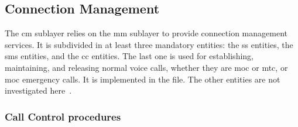 \subsection{Connection Management}

  The \gls{cm} sublayer relies on the \gls{mm} sublayer to provide
  connection management services. It is subdivided in at least three
  mandatory entities: the \gls{ss} entities, the \gls{sms} entities,
  and the \gls{cc} entities. The last one is used for establishing,
  maintaining, and releasing normal voice calls, whether they are
  \gls{moc} or \gls{mtc}, or \gls{moc} emergency calls. It is
  implemented in the  file. The other
  entities are not investigated here~\cite{3gpp_ts_2015-5}.
  \iffalse
  \subsubsection{Short Message Services}

  The \gls{sms} entity on the \gls{ms} implements two protocols to
  communicate over the Um interface: the \gls{smcp}, and the
  \gls{smrp}. The first one is used to communicate between two
  \gls{smc} entities, while the second one is used to communicate
  between two \gls{smr} entities. An \gls{smc} entity is part of the
  \gls{cm} sublayer and provides services to the \gls{smr} entity,
  part of the \gls{smr} layer. Finally, the \gls{smr} layer provides
  services to the \gls{smt} layer. 

  When a message transfer is requested by the \gls{smt} layer, the
  \gls{smr} entity sends an RP-Data message to the \gls{smc} entity.
  The \gls{smc} entity will then establish an \gls{mm} connection and,
  when it is ready, send a CP-Data message. If the receiving \gls{smc}
  entity can accept the data, it transmits the message to the
  \gls{smr} layer and answers with a CP-Ack message. Otherwise it
  sends a CP-Error message. The sending \gls{smc} entity will then
  respectively transmit an RP-Ack or RP-Error message to the sending
  \gls{smr} entity.

  These procedures are implemented in the \prog{mobile} application of
  \proj{OsmocomBB} and can be found in
  \code{mobile/gsm411\_sms.c}.
  \fi

  \subsubsection{Call Control procedures}

